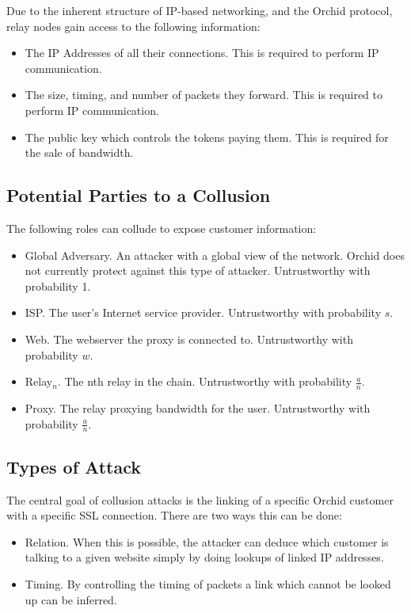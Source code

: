 \documentclass{article}
\newcommand{\orchid}{Orchid}
\newcommand{\Orchid}{\orchid}
\begin{document}
Due to the inherent structure of IP-based networking, and the \Orchid{} protocol, relay nodes gain access to the following information:

\begin{itemize}
\item The IP Addresses of all their connections. This is required to perform IP communication.
\item The size, timing, and number of packets they forward. This is required to perform IP communication.
\item The public key which controls the tokens paying them. This is required for the sale of bandwidth.
\end{itemize}

\subsection{Potential Parties to a Collusion}
\label{sec:collusion}

The following roles can collude to expose customer information:

\begin{itemize}
\item Global Adversary. An attacker with a global view of the network. \Orchid{} does not currently protect against this type of attacker. Untrustworthy with probability 1.
\item ISP. The user's Internet service provider. Untrustworthy with probability $s$.
\item Web. The webserver the proxy is connected to. Untrustworthy with probability $w$.
\item Relay$_n$. The nth relay in the chain. Untrustworthy with probability $\frac{a}{n}$.
\item Proxy. The relay proxying bandwidth for the user. Untrustworthy with probability $\frac{a}{n}$.
\end{itemize}

\subsection{Types of Attack}

The central goal of collusion attacks is the linking of a specific
\Orchid{} customer with a specific SSL connection. There are two ways
this can be done:

\begin{itemize}
\item Relation. When this is possible, the attacker can deduce which
  customer is talking to a given website simply by doing lookups of
  linked IP addresses.
\item Timing. By controlling the timing of packets a link which cannot
  be looked up can be inferred.
\end{itemize}
\end{document}
